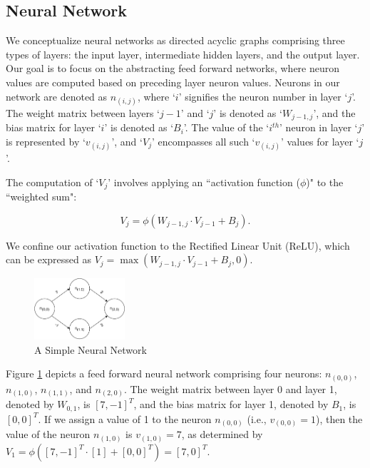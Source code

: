 \subsection{Neural Network}
We conceptualize neural networks as directed acyclic graphs 
comprising three types of layers: the input layer, intermediate hidden layers, 
and the output layer. Our goal is to focus on the abstracting feed forward networks, 
where neuron values are computed based on preceding layer neuron values. 
Neurons in our network are denoted as $n_{(i,j)}$, where `$i$' signifies the 
neuron number in layer `$j$'. The weight matrix between layers `${j-1}$' and `$j$' 
is denoted as `$W_{{j-1}, j}$', and the bias matrix for layer `$i$' is denoted as 
`$B_{i}$'. The value of the `$i^{th}$' neuron in layer `$j$' is represented by 
`$v_{(i,j)}$', and `$V_{j}$' encompasses all such `$v_{(i,j)}$' values for layer 
`$j$'.

The computation of `$V_{j}$' involves applying an ``activation function ($\phi$)" 
to the ``weighted sum":

\[V_{j} = \phi(W_{{j-1}, j} \cdot V_{j-1} + B_{j}).\] 

We confine our activation function to the Rectified Linear Unit (ReLU), 
which can be expressed as $V_{j} = \max(W_{j-1, j} \cdot V_{j-1} + B_{j}, 0)$.


\begin{figure}[H]
    \centering
    \includegraphics[width=0.3\textwidth, height = 0.15\textwidth]{diagrams/Basic_Neural_Network.pdf}
    \caption{A Simple Neural Network}
    \label{Figure: Simple Neurla}

\end{figure} 

Figure \ref{Figure: Simple Neurla} depicts a feed forward neural network 
comprising four neurons: $n_{(0, 0)}$, $n_{(1, 0)}$, $n_{(1, 1)}$, and $n_{(2, 0)}$. 
The weight matrix between layer 0 and layer 1, denoted by $W_{0,1}$, 
is $[7, -1]^T$, and the bias matrix for layer 1, denoted by $B_{1}$, 
is $[0, 0]^T$. If we assign a value of 1 to the neuron $n_{(0, 0)}$ 
(i.e., $v_{(0, 0)}=1$), then the value of the neuron $n_{(1,0)}$ is $v_{(1,0)}=7$, 
as determined by $V_{1} = \phi([7, -1]^{T} \cdot [1] + [0, 0]^{T}) = [7, 0]^{T}$.


